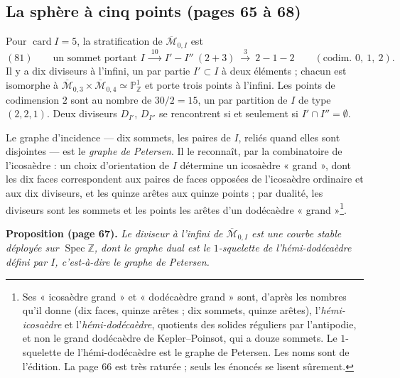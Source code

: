 \documentclass[11pt,a4paper]{article}
\begin{document}
\subsection*{La sphère à cinq points (pages 65 à 68)}

Pour $\operatorname{card} I = 5$, la stratification de $\overline{\mathcal{M}}_{0,I}$
est
\[
(81) \qquad \text{un sommet portant } I \ \xrightarrow{\ 10\ } \ I' - I''
\ (2 + 3) \ \xrightarrow{\ 3\ } \ 2 - 1 - 2
\qquad (\text{codim. } 0,\ 1,\ 2) .
\]
Il y a dix diviseurs à l'infini, un par partie $I' \subset I$ à deux éléments ;
chacun est isomorphe à $\overline{\mathcal{M}}_{0,3} \times
\overline{\mathcal{M}}_{0,4} \simeq \mathbb{P}^1_{\mathbb{Z}}$ et porte trois
points à l'infini. Les points de codimension $2$ sont au nombre de $30/2 = 15$, un
par partition de $I$ de type $(2, 2, 1)$. Deux diviseurs $D_{I'}$, $D_{I''}$ se
rencontrent si et seulement si $I' \cap I'' = \emptyset$.

Le graphe d'incidence — dix sommets, les paires de $I$, reliés quand elles sont
disjointes — est le \emph{graphe de Petersen}. Il le reconnaît, par la combinatoire
de l'icosaèdre : un choix d'orientation de $I$ détermine un icosaèdre « grand »,
dont les dix faces correspondent aux paires de faces opposées de l'icosaèdre
ordinaire et aux dix diviseurs, et les quinze arêtes aux quinze points ; par
dualité, les diviseurs sont les sommets et les points les arêtes d'un dodécaèdre
« grand »\footnote{Ses « icosaèdre grand » et « dodécaèdre grand » sont, d'après
les nombres qu'il donne (dix faces, quinze arêtes ; dix sommets, quinze arêtes),
l'\emph{hémi-icosaèdre} et l'\emph{hémi-dodécaèdre}, quotients des solides
réguliers par l'antipodie, et non le grand dodécaèdre de Kepler--Poinsot, qui a
douze sommets. Le $1$-squelette de l'hémi-dodécaèdre est le graphe de Petersen.
Les noms sont de l'édition. La page 66 est très raturée ; seuls les énoncés se
lisent sûrement.}.

\textbf{Proposition (page 67).} \emph{Le diviseur à l'infini de
$\overline{\mathcal{M}}_{0,I}$ est une courbe stable déployée sur
$\operatorname{Spec} \mathbb{Z}$, dont le graphe dual est le $1$-squelette de
l'hémi-dodécaèdre défini par $I$, c'est-à-dire le graphe de Petersen.}
\end{document}
